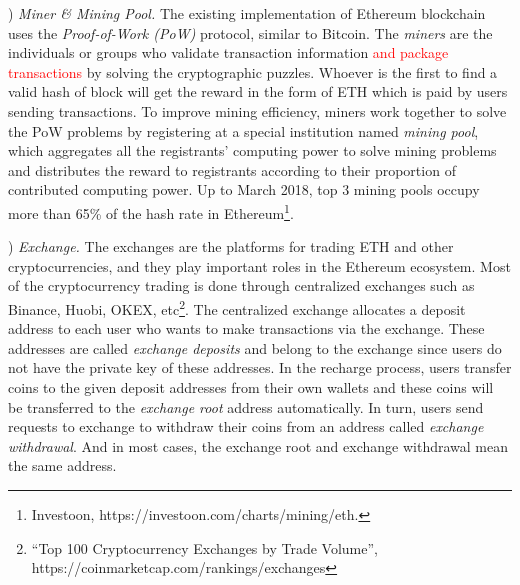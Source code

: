 ) \emph{Miner \& Mining Pool.}
The existing implementation of Ethereum blockchain uses the \emph{Proof-of-Work (PoW)} protocol, similar to Bitcoin. The \emph{miners} are the individuals or groups who validate transaction information \textcolor{red}{and package transactions} by solving the cryptographic puzzles. Whoever is the first to find a valid hash of block will get the reward in the form of ETH which is paid by users sending transactions. To improve mining efficiency, miners work together to solve the PoW problems by registering at a special institution named \emph{mining pool}, which aggregates all the registrants' computing power to solve mining problems and distributes the reward to registrants according to their proportion of contributed computing power. Up to March 2018, top $3$ mining pools occupy more than 65\% of the hash rate in Ethereum\footnote{Investoon, https://investoon.com/charts/mining/eth.}.

) \emph{Exchange.}
The exchanges are the platforms for trading ETH and other cryptocurrencies, and they play important roles in the Ethereum ecosystem. Most of the cryptocurrency trading is done through centralized exchanges such as Binance, Huobi, OKEX, etc\footnote{``Top 100 Cryptocurrency Exchanges by Trade Volume'', https://coinmarketcap.com/rankings/exchanges}. The centralized exchange allocates a deposit address to each user who wants to make transactions via the exchange. These addresses are called \emph{exchange deposits} and belong to the exchange since users do not have the private key of these addresses. In the recharge process, users transfer coins to the given deposit addresses from their own wallets and these coins will be transferred to the \emph{exchange root} address automatically. In turn, users send requests to exchange to withdraw their coins from an address called \emph{exchange withdrawal}. And in most cases, the exchange root and exchange withdrawal mean the same address.




